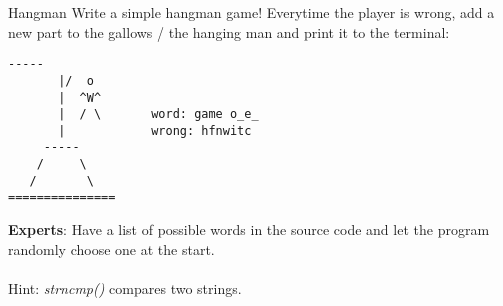 \begin{frame}[fragile]{Hangman}
	Write a simple hangman game! Everytime the player is wrong,
	add a new part to the gallows / the hanging man and print it to the terminal:
	\begin{lstlisting}[numbers=none]
       -----    
       |/  o 
       |  ^W^
       |  / \		word: game o_e_
       |     		wrong: hfnwitc
     -----   
    /     \
   /       \
===============
\end{lstlisting}
	\textbf{Experts}: Have a list of possible words in the source code and let the program randomly choose one at the start.\\
	\ \\
	Hint: \textit{strncmp()} compares two strings.
\end{frame}

